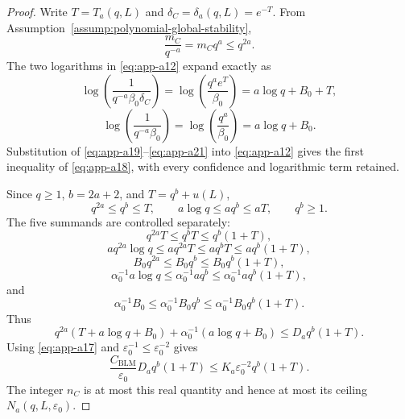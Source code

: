 \begin{proof}
Write \(T=T_a(q,L)\) and
\(\delta_C=\delta_a(q,L)=e^{-T}\).  From
Assumption~\ref{assump:polynomial-global-stability},
\begin{equation}
\frac{m_C}{q^{-a}}=m_Cq^a\leq q^{2a}.
\label{eq:app-a19}
\end{equation}
The two logarithms in \eqref{eq:app-a12} expand exactly as
\begin{equation}
\log\!\left(\frac1{q^{-a}\beta_0\delta_C}\right)
=\log\!\left(\frac{q^ae^T}{\beta_0}\right)
=a\log q+B_0+T,
\label{eq:app-a20}
\end{equation}
\begin{equation}
\log\!\left(\frac1{q^{-a}\beta_0}\right)
=\log\!\left(\frac{q^a}{\beta_0}\right)
=a\log q+B_0.
\label{eq:app-a21}
\end{equation}
Substitution of \eqref{eq:app-a19}--\eqref{eq:app-a21} into \eqref{eq:app-a12} gives the first inequality
of \eqref{eq:app-a18}, with every confidence and logarithmic term retained.

Since \(q\geq1\), \(b=2a+2\), and
\(T=q^b+u(L)\),
\begin{equation}
q^{2a}\leq q^b\leq T,\qquad
a\log q\leq aq^b\leq aT,\qquad
q^b\geq1.
\label{eq:app-a22}
\end{equation}
The five summands are controlled separately:
\begin{equation}
q^{2a}T\leq q^bT\leq q^b(1+T),
\label{eq:app-a23}
\end{equation}
\begin{equation}
aq^{2a}\log q
\leq aq^{2a}T
\leq aq^bT
\leq aq^b(1+T),
\label{eq:app-a24}
\end{equation}
\begin{equation}
B_0q^{2a}
\leq B_0q^b
\leq B_0q^b(1+T),
\label{eq:app-a25}
\end{equation}
\begin{equation}
\alpha_0^{-1}a\log q
\leq\alpha_0^{-1}aq^b
\leq\alpha_0^{-1}aq^b(1+T),
\label{eq:app-a26}
\end{equation}
and
\begin{equation}
\alpha_0^{-1}B_0
\leq\alpha_0^{-1}B_0q^b
\leq\alpha_0^{-1}B_0q^b(1+T).
\label{eq:app-a27}
\end{equation}
Thus
\begin{equation}
q^{2a}(T+a\log q+B_0)
+\alpha_0^{-1}(a\log q+B_0)
\leq D_aq^b(1+T).
\label{eq:app-a28}
\end{equation}
Using \eqref{eq:app-a17} and
\(\varepsilon_0^{-1}\leq\varepsilon_0^{-2}\) gives
\begin{equation}
\frac{C_{\mathrm{BLM}}}{\varepsilon_0}
D_aq^b(1+T)
\leq
K_a\varepsilon_0^{-2}q^b(1+T).
\label{eq:app-a29}
\end{equation}
The integer \(n_C\) is at most this real quantity and hence at most
its ceiling \(N_a(q,L,\varepsilon_0)\).


\end{proof}

